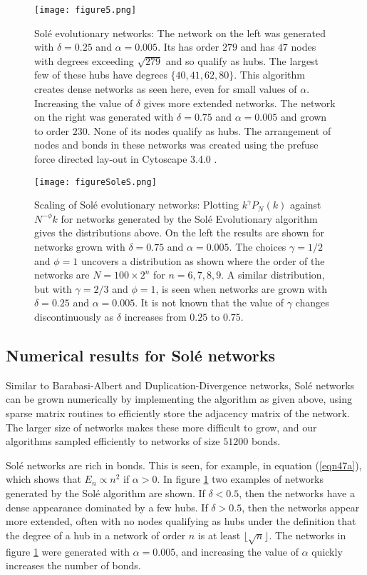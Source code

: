 \documentclass[12pt]{iopart}
\def\Ref#1{(\ref{#1})}
\begin{document}
\begin{figure}[t!]
 \centering
\texttt{[image: figure5.png]}
\caption{{Sol\'e evolutionary networks:}
The network on the left was generated with $\delta=0.25$ and
$\alpha=0.005$.  Its has order $279$ and has $47$ nodes with
degrees exceeding $\sqrt{279}$ and so qualify as hubs.  The largest few of these
hubs have degrees $\{40,41,62,80\}$.  This algorithm creates dense networks
as seen here, even for small values of $\alpha$.  Increasing the value of
$\delta$ gives more extended networks.  The network on the right
was generated with $\delta=0.75$ and $\alpha=0.005$ and grown to order
$230$.  None of its nodes qualify as hubs.
 The arrangement of nodes and bonds in
these networks was created using the prefuse force directed lay-out in Cytoscape 3.4.0
\cite{Cytoscape}.}
\label{figure5S}
\end{figure}

\begin{figure}[t!]
 \centering
\texttt{[image: figureSoleS.png]}
\caption{{Scaling of Sol\'e evolutionary networks:}
Plotting $k^\gamma P_N(k)$ against $N^{-\phi}k$ for networks generated
by the Sol\'e Evolutionary algorithm gives the distributions above.
On the left the results are shown for networks grown with
$\delta=0.75$ and $\alpha=0.005$.  The choices $\gamma=1/2$ and
$\phi=1$ uncovers a distribution as shown where the order of the
networks are $N=100\times 2^n$ for $n=6,7,8,9$.  A similar
distribution, but with $\gamma=2/3$ and $\phi=1$, is seen
when networks are grown with $\delta=0.25$ and $\alpha=0.005$.
It is not known that the value of $\gamma$ changes discontinuously
as $\delta$ increases from $0.25$ to $0.75$.}
\label{figureSoleS}
\end{figure}

\subsection{Numerical results for Sol\'e networks}

Similar to Barabasi-Albert and Duplication-Divergence networks, Sol\'e networks
can be grown numerically by implementing the algorithm as given above, using
sparse matrix routines to efficiently store the adjacency matrix of the network.
The larger size of networks makes these more difficult to grow, and our 
algorithms sampled efficiently to networks of size $51200$ bonds.

Sol\'e networks are rich in bonds.  This is seen, for example, in equation
\Ref{eqn47a}, which shows that $E_n \propto n^2$ if $\alpha>0$.
In figure \ref{figure5S} two examples of networks generated by the Sol\'e 
algorithm are shown.  If $\delta < 0.5$, then the networks have a dense appearance 
dominated by a few hubs.  If $\delta > 0.5$, then the networks appear more extended, 
often with no nodes qualifying as hubs under the definition that the degree of a hub
in a network of order $n$ is at least $\lfloor \sqrt{n} \rfloor$.   The networks in 
figure \ref{figure5S} were generated with $\alpha=0.005$, and increasing the value 
of $\alpha$ quickly increases the number of bonds.
\end{document}
